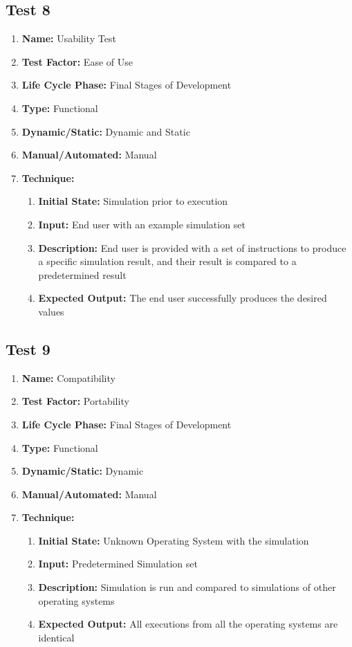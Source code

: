 \documentclass[paper=letter, fontsize=10pt]{scrartcl}
\numberwithin{equation}{section}		%
\numberwithin{figure}{section}			%
\numberwithin{table}{section}				%
\begin{document}
\subsection{Test 8}
\begin{enumerate}[a]
	\item \textbf{Name:} Usability Test
	\item \textbf{Test Factor:} Ease of Use
	\item \textbf{Life Cycle Phase:} Final Stages of Development
	\item \textbf{Type:} Functional
	\item \textbf{Dynamic/Static:} Dynamic and Static
	\item \textbf{Manual/Automated:} Manual
	\item \textbf{Technique:}
		\begin{enumerate}[i]
			\item \textbf{Initial State:} Simulation prior to execution  
			\item \textbf{Input:} End user with an example simulation set
			\item \textbf{Description:} End user is provided with a set of instructions to produce a specific simulation result, and their result is compared to a predetermined result  
			\item \textbf{Expected Output:} The end user successfully produces the desired values
		\end{enumerate}
\end{enumerate}

\subsection{Test 9}
\begin{enumerate}[a]
	\item \textbf{Name:} Compatibility 
	\item \textbf{Test Factor:} Portability 
	\item \textbf{Life Cycle Phase:} Final Stages of Development
	\item \textbf{Type:} Functional
	\item \textbf{Dynamic/Static:} Dynamic
	\item \textbf{Manual/Automated:} Manual
	\item \textbf{Technique:}
		\begin{enumerate}[i]
			\item \textbf{Initial State:} Unknown Operating System with the simulation  
			\item \textbf{Input:} Predetermined Simulation set
			\item \textbf{Description:} Simulation is run and compared to simulations of other operating systems
			\item \textbf{Expected Output:} All executions from all the operating systems are identical
		\end{enumerate}
\end{enumerate}
\end{document}

